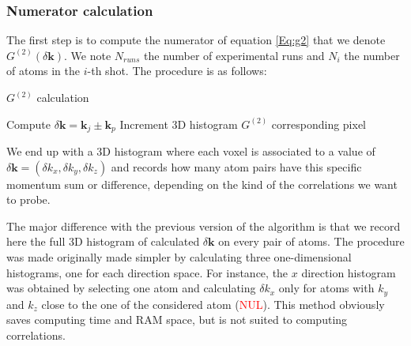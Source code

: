 \subsubsection{Numerator calculation}

The first step is to compute the numerator of equation \ref{Eq:g2} that we denote $G^{(2)}(\delta \bm{k})$. We note $N_{runs}$ the number of experimental runs and $N_{i}$ the number of atoms in the $i$-th shot. The procedure is as follows:


\begin{algorithm}
 \caption{$G^{(2)}$ calculation}
    \begin{algorithmic}
                    \State Compute $\delta \bm{k} = \bm{k}_j \pm \bm{k}_p$
                    \State Increment 3D histogram $G^{(2)}$ corresponding pixel
                \EndFor
            \EndFor
        \EndFor
\end{algorithmic}

\end{algorithm}

We end up with a 3D histogram where each voxel is associated to a value of $\delta \bm{k} = (\delta k_x,\delta k_y, \delta k_z)$ and records how many atom pairs have this specific momentum sum or difference, depending on the kind of the correlations we want to probe.

The major difference with the previous version of the algorithm is that we record here the full 3D histogram of calculated $\delta \bm{k}$ on every pair of atoms. The procedure was made originally made simpler by calculating three one-dimensional histograms, one for each direction space. For instance, the $x$ direction histogram was obtained by selecting one atom and calculating $\delta k_x$ only for atoms with $k_y$ and $k_z$ close to the one of the considered atom (\textcolor{red}{NUL}). This method obviously saves computing time and RAM space, but is not suited to computing \kmk correlations.

